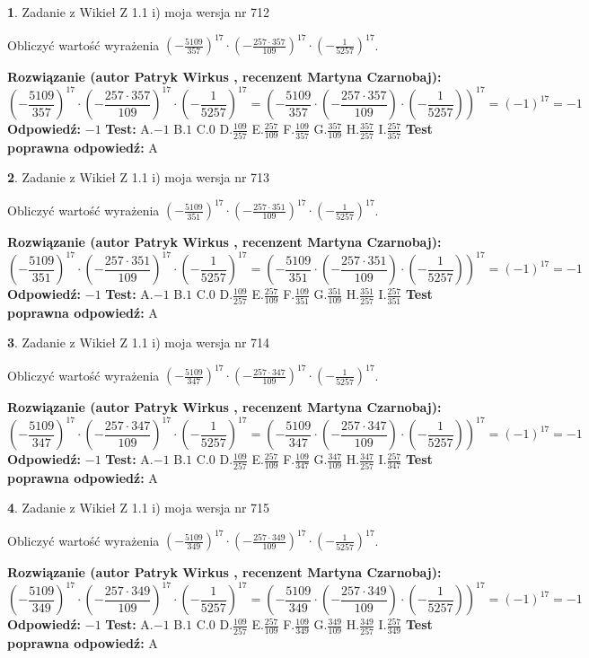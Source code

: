 \documentclass[12pt, a4paper]{article}
\theoremstyle{definition} %
\newtheorem{zad}{}
\newcommand{\zadStart}[1]{\begin{zad}#1\newline}
\newcommand{\zadStop}{\end{zad}}
\newcommand{\rozwStart}[2]{\noindent \textbf{Rozwiązanie (autor #1 , recenzent #2): }\newline}
\newcommand{\rozwStop}{\newline}
\newcommand{\odpStart}{\noindent \textbf{Odpowiedź:}\newline}
\newcommand{\odpStop}{\newline}
\newcommand{\testStart}{\noindent \textbf{Test:}\newline}
\newcommand{\testStop}{\newline}
\newcommand{\kluczStart}{\noindent \textbf{Test poprawna odpowiedź:}\newline}
\newcommand{\kluczStop}{\newline}
\begin{document}
\zadStart{Zadanie z Wikieł Z 1.1 i) moja wersja nr 712}

Obliczyć wartość wyrażenia $(-\frac{5109}{357})^{17} \cdot (-\frac{257 \cdot 357}{109})^{17} \cdot (-\frac{1}{5257})^{17}$.
\zadStop
\rozwStart{Patryk Wirkus}{Martyna Czarnobaj}
$$(-\frac{5109}{357})^{17} \cdot (-\frac{257 \cdot 357}{109})^{17} \cdot (-\frac{1}{5257})^{17} = (-\frac{5109}{357} \cdot (-\frac{257 \cdot 357}{109}) \cdot (-\frac{1}{5257}))^{17} = (-1)^{17} = -1$$
\rozwStop
\odpStart
$-1$
\odpStop
\testStart
A.$-1$ B.$1$ C.$0$ D.$\frac{109}{257}$ E.$\frac{257}{109}$
F.$\frac{109}{357}$ G.$\frac{357}{109}$
H.$\frac{357}{257}$
I.$\frac{257}{357}$
\testStop
\kluczStart
A
\kluczStop



\zadStart{Zadanie z Wikieł Z 1.1 i) moja wersja nr 713}

Obliczyć wartość wyrażenia $(-\frac{5109}{351})^{17} \cdot (-\frac{257 \cdot 351}{109})^{17} \cdot (-\frac{1}{5257})^{17}$.
\zadStop
\rozwStart{Patryk Wirkus}{Martyna Czarnobaj}
$$(-\frac{5109}{351})^{17} \cdot (-\frac{257 \cdot 351}{109})^{17} \cdot (-\frac{1}{5257})^{17} = (-\frac{5109}{351} \cdot (-\frac{257 \cdot 351}{109}) \cdot (-\frac{1}{5257}))^{17} = (-1)^{17} = -1$$
\rozwStop
\odpStart
$-1$
\odpStop
\testStart
A.$-1$ B.$1$ C.$0$ D.$\frac{109}{257}$ E.$\frac{257}{109}$
F.$\frac{109}{351}$ G.$\frac{351}{109}$
H.$\frac{351}{257}$
I.$\frac{257}{351}$
\testStop
\kluczStart
A
\kluczStop



\zadStart{Zadanie z Wikieł Z 1.1 i) moja wersja nr 714}

Obliczyć wartość wyrażenia $(-\frac{5109}{347})^{17} \cdot (-\frac{257 \cdot 347}{109})^{17} \cdot (-\frac{1}{5257})^{17}$.
\zadStop
\rozwStart{Patryk Wirkus}{Martyna Czarnobaj}
$$(-\frac{5109}{347})^{17} \cdot (-\frac{257 \cdot 347}{109})^{17} \cdot (-\frac{1}{5257})^{17} = (-\frac{5109}{347} \cdot (-\frac{257 \cdot 347}{109}) \cdot (-\frac{1}{5257}))^{17} = (-1)^{17} = -1$$
\rozwStop
\odpStart
$-1$
\odpStop
\testStart
A.$-1$ B.$1$ C.$0$ D.$\frac{109}{257}$ E.$\frac{257}{109}$
F.$\frac{109}{347}$ G.$\frac{347}{109}$
H.$\frac{347}{257}$
I.$\frac{257}{347}$
\testStop
\kluczStart
A
\kluczStop



\zadStart{Zadanie z Wikieł Z 1.1 i) moja wersja nr 715}

Obliczyć wartość wyrażenia $(-\frac{5109}{349})^{17} \cdot (-\frac{257 \cdot 349}{109})^{17} \cdot (-\frac{1}{5257})^{17}$.
\zadStop
\rozwStart{Patryk Wirkus}{Martyna Czarnobaj}
$$(-\frac{5109}{349})^{17} \cdot (-\frac{257 \cdot 349}{109})^{17} \cdot (-\frac{1}{5257})^{17} = (-\frac{5109}{349} \cdot (-\frac{257 \cdot 349}{109}) \cdot (-\frac{1}{5257}))^{17} = (-1)^{17} = -1$$
\rozwStop
\odpStart
$-1$
\odpStop
\testStart
A.$-1$ B.$1$ C.$0$ D.$\frac{109}{257}$ E.$\frac{257}{109}$
F.$\frac{109}{349}$ G.$\frac{349}{109}$
H.$\frac{349}{257}$
I.$\frac{257}{349}$
\testStop
\kluczStart
A
\kluczStop
\end{document}
